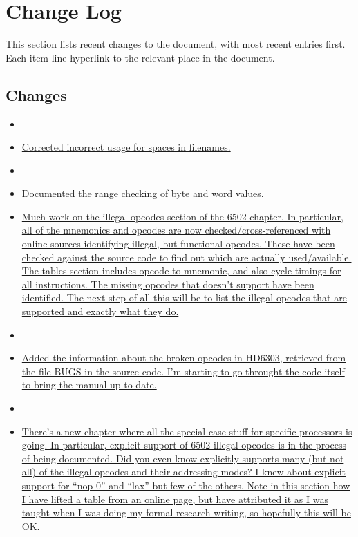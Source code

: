 \section*{Change Log}
\label{section:changelog}

This section lists recent changes to the document, with most recent entries first. Each item line hyperlink to the relevant place in the document.

\subsection*{Changes}

\begin{itemize}
\item[]
\item \hyperref[changelog:20200906spaces]{Corrected incorrect usage for spaces in filenames.}
\item[]
\item \hyperref[changelog:20200905range]{Documented the range checking of byte and word values.}
\item \hyperref[changelog:20200904illegal]{Much work on the illegal opcodes section of the 6502 chapter. In particular, all of the mnemonics and opcodes are now checked/cross-referenced with online sources identifying illegal, but functional opcodes. These have been checked against the \dasm source code to find out which are actually used/available. The tables section includes opcode-to-mnemonic, and also cycle timings for all instructions. The missing opcodes that \dasm doesn't support have been identified. The next step of all this will be to list the illegal opcodes that are supported and exactly what they do.}
\item[]
\item \hyperref[changelog:20200903bug]{Added the information about the broken opcodes in HD6303, retrieved from the file BUGS in the source code. I'm starting to go throught the code itself to bring the manual up to date.}
\item[]
\item \hyperref[changelog20200901_nop3]{There's a new chapter where all the special-case stuff for specific processors is going. In particular, explicit support of 6502 illegal opcodes is in the process of being documented. Did you even know \dasm explicitly supports many (but not all) of the illegal opcodes and their addressing modes? I knew about explicit support for ``nop 0'' and ``lax'' but few of the others. Note in this section how I have lifted a table from an online page, but have attributed it as I was taught when I was doing my formal research writing, so hopefully this will be OK.}

\end{itemize}
